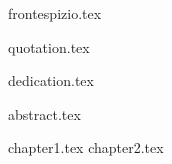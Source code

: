\documentclass[12pt,oneside,italian]{book}
\begin{document}

{frontespizio.tex}

{quotation.tex}

{dedication.tex}

{abstract.tex}

{chapter1.tex}
{chapter2.tex}



\tableofcontents %
\listoffigures %

\printbibliography

\end{document}
